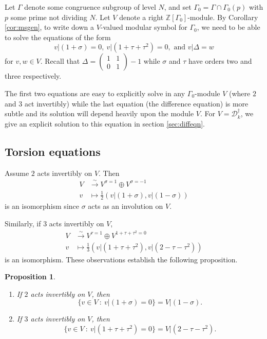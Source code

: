 \documentclass{amsart}
\theoremstyle{plain}
\newtheorem{prop}[thm]{Proposition}
\theoremstyle{definition}
\newcommand{\D}{{\mathcal D}}
\newcommand{\Z}{{\mathbb Z}}
\newcommand{\maps}{\rightarrow}
\newcommand{\psmallmat}[4]{\left( \begin{smallmatrix} #1 & #2 \\ #3 & #4 \end{smallmatrix} \right)}
\newcommand{\Dkoc}{\D_k^\dag}
\begin{document}
Let $\Gamma$ denote some congruence subgroup of level $N$, and set $\Gamma_0 = \Gamma \cap \Gamma_0(p)$ with $p$ some prime not dividing $N$.  Let $V$ denote a right $\Z[\Gamma_0]$-module.  By Corollary \ref{cor:msgen}, to write down a $V$-valued modular symbol for $\Gamma_0$, we need to be able to solve the equations of the form
$$
v\big| (1+\sigma) = 0,~
v\big| (1+\tau+\tau^2) = 0,\text{~and~}
v\big| \Delta = w
$$
for $v,w \in V$.  Recall that $\Delta = \psmallmat{1}{1}{0}{1} -1$
while $\sigma$ and $\tau$ have orders two and three respectively.

The first two equations are easy to explicitly solve in any $\Gamma_0$-module $V$ (where $2$ and $3$ act invertibly) while the last equation (the difference equation) is more subtle and its solution will depend heavily upon the module $V$.  For $V = \Dkoc$, we give an explicit solution to this equation in section \ref{sec:diffeqn}.

\subsection{Torsion equations}

Assume $2$ acts invertibly on $V$.  Then
\begin{align*}
V &\stackrel{\sim}{\maps} V^{\sigma = 1} \oplus V^{\sigma = -1} \\
v &\mapsto \frac{1}{2} \left( v \big|(1+\sigma),v\big|(1-\sigma)\right)
\end{align*}
is an isomorphism since $\sigma$ acts as an involution on $V$.  

Similarly, if $3$ acts invertibly on $V$,  
\begin{align*}
V &\stackrel{\sim}{\maps} V^{\tau = 1} \oplus V^{1+ \tau + \tau^2 = 0} \\
v &\mapsto \frac{1}{3} \left(v\big|(1+\tau+\tau^2),v\big|(2-\tau-\tau^2)\right)
\end{align*}
is an isomorphism.  These observations establish the following proposition.

\begin{prop} ~
\begin{enumerate}
\item If $2$ acts invertibly on $V$, then
$$
\{ v \in V ~:~ v \big| (1+\sigma) =0 \} = V \big| (1-\sigma).
$$
\item If $3$ acts invertibly on $V$, then
$$
\{ v \in V ~:~ v \big| (1+\tau+\tau^2)=0 \} = V \big| (2-\tau-\tau^2).
$$
\end{enumerate}
\end{prop}
\end{document}
